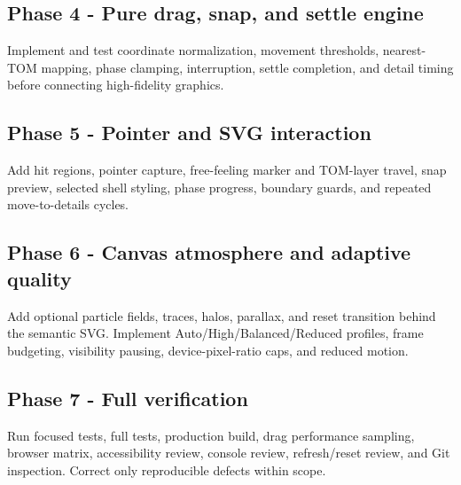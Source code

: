 \documentclass[11pt,letterpaper]{article}
\begin{document}
\subsection{Phase 4 - Pure drag, snap, and settle engine}
Implement and test coordinate normalization, movement thresholds, nearest-TOM mapping, phase clamping, interruption, settle completion, and detail timing before connecting high-fidelity graphics.

\subsection{Phase 5 - Pointer and SVG interaction}
Add hit regions, pointer capture, free-feeling marker and TOM-layer travel, snap preview, selected shell styling, phase progress, boundary guards, and repeated move-to-details cycles.

\subsection{Phase 6 - Canvas atmosphere and adaptive quality}
Add optional particle fields, traces, halos, parallax, and reset transition behind the semantic SVG. Implement Auto/High/Balanced/Reduced profiles, frame budgeting, visibility pausing, device-pixel-ratio caps, and reduced motion.

\subsection{Phase 7 - Full verification}
Run focused tests, full tests, production build, drag performance sampling, browser matrix, accessibility review, console review, refresh/reset review, and Git inspection. Correct only reproducible defects within scope.
\end{document}
